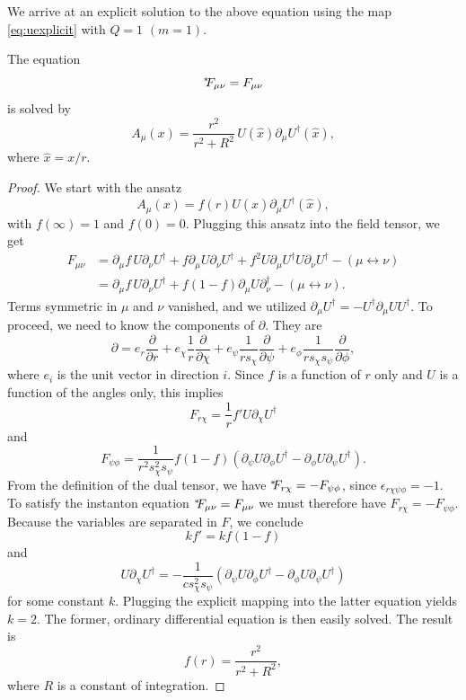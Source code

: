 We arrive at an explicit solution to the above equation using
the map \eqref{eq:uexplicit} with $Q=1$ $(m=1)$.
\begin{proposition}{}{}
The equation
$$
{}^{*\hspace{-1mm}}{F_{\mu\nu}}=F_{\mu\nu}
$$
is solved by
$$
  A_\mu(x)=\frac{r^2}{r^2+R^2}\,U(\hat{x})\partial_\mu U^\dagger(\hat{x}),
$$
where $\hat{x}=x/r.$
  \begin{proof} We start with the ansatz
    $$A_\mu(x)=f(r)U(\hat{x})\partial_\mu U^\dagger(\hat{x}),$$
    with $f(\infty)=1$ and $f(0)=0$. Plugging this ansatz into the
    field tensor, we get
    \begin{equation*}
    \begin{aligned}
      F_{\mu\nu}
        &=\partial_\mu f\,U\partial_\nu U^\dagger
          +f\partial_\mu U\partial_\nu U^\dagger
          +f^2U\partial_\mu U^\dagger U\partial_\nu U^\dagger
          -(\mu\leftrightarrow\nu)\\
        &=\partial_\mu f\,U\partial_\nu U^\dagger
          +f(1-f)\partial_\mu U\partial_\nu^\dagger
          -(\mu\leftrightarrow\nu).
    \end{aligned}
    \end{equation*}
   Terms symmetric in $\mu$ and $\nu$ vanished, and we utilized
    $\partial_\mu U^\dagger=-U^\dagger\partial_\mu UU^\dagger.$
    To proceed, we need to know the components of $\partial$.
    They are
    \begin{equation*}
     \partial=e_r\frac{\partial}{\partial r}
     +e_\chi\frac{1}{r}\frac{\partial}{\partial \chi}
     +e_\psi\frac{1}{rs_{\chi}}\frac{\partial}{\partial \psi}
     +e_\phi\frac{1}{rs_{\chi}s_{\psi}}\frac{\partial}{\partial \phi},
    \end{equation*}
    where $e_i$ is the unit vector in direction $i$. Since $f$ is
    a function of $r$ only and $U$ is a function of the angles
    only, this implies
    $$
      F_{r\chi}=\frac{1}{r}f'U\partial_\chi U^\dagger
    $$
    and
   $$
      F_{\psi\phi}=\frac{1}{r^2s^2_\chi s_\psi}
        f(1-f)\left(\partial_\psi U\partial_\phi U^\dagger
                    -\partial_\phi U\partial_\psi U^\dagger\right).
    $$
    From the definition of the dual tensor, we have
    ${}^{*\hspace{-1mm}}{F_{r\chi}}=-F_{\psi\phi}$, since $\epsilon_{r\chi\psi\phi}=-1$.
    To satisfy the instanton equation ${}^{*\hspace{-1mm}}{F_{\mu\nu}}=F_{\mu\nu}$
    we must therefore have $F_{r\chi}=-F_{\psi\phi}$. Because
    the variables are separated in $F$, we conclude
    $$
      kf'=kf(1-f)
    $$
   and
    $$
      U\partial_\chi U^\dagger=-\frac{1}{cs_\chi^2s_\psi}
               \left(\partial_\psi U\partial_\phi U^\dagger
                    -\partial_\phi U\partial_\psi U^\dagger\right) 
    $$
    for some constant $k$. Plugging the explicit mapping into the
    latter equation yields $k=2$. The former, ordinary differential
    equation is then easily solved. The result is
    $$
      f(r)=\frac{r^2}{r^2+R^2},
    $$
    where $R$ is a constant of integration.
\end{proof}
\end{proposition}


